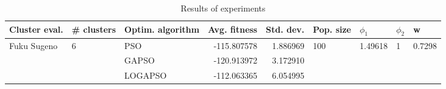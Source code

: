 \begin{table}
\centering
\caption{Results of experiments}
\begin{tabular}{lllrrllll}
\toprule
               Cluster eval. &        \# clusters & Optim. algorithm &  Avg. fitness &  Std. dev. &            Pop. size &               $\phi_{1}$ &         $\phi_{2}$ &                       w \\
\midrule
\multirow{3}{*}{Fuku Sugeno} & \multirow{3}{*}{6} &              PSO &   -115.807578 &   1.886969 & \multirow{3}{*}{100} & \multirow{3}{*}{1.49618} & \multirow{3}{*}{1} & \multirow{3}{*}{0.7298} \\
                             &                    &            GAPSO &   -120.913972 &   3.172910 &                      &                          &                    &                         \\
                             &                    &          LOGAPSO &   -112.063365 &   6.054995 &                      &                          &                    &                         \\
\bottomrule
\end{tabular}
\end{table}
